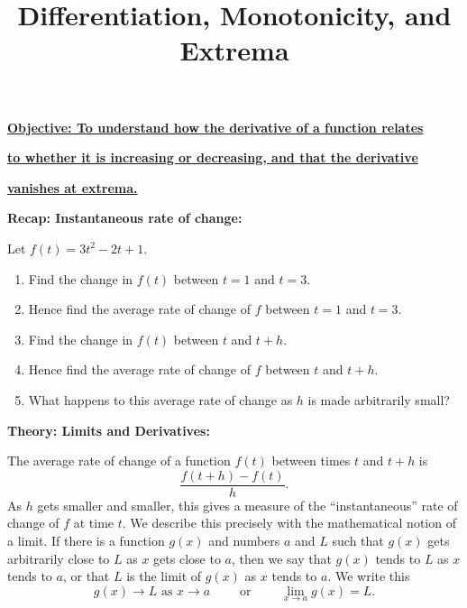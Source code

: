 \documentclass{article}
\begin{document}
\title{Differentiation, Monotonicity, and Extrema}
\date{}

\maketitle
\thispagestyle{empty}

\Large

\textbf{\underline{Objective: To understand how the derivative of a function relates}}

\textbf{\underline{to whether it is increasing or decreasing, and that the derivative}}

\textbf{\underline{vanishes at extrema.}}




\vspace{5mm}


\textbf{Recap: Instantaneous rate of change:}

\vspace{5mm}

Let $f(t)=3t^2-2t+1$.
\begin{enumerate}
	\item Find the change in $f(t)$ between $t=1$ and $t=3$.
	\item Hence find the average rate of change of $f$ between $t=1$ and $t=3$.
	\item Find the change in $f(t)$ between $t$ and $t+h$.
	\item Hence find the average rate of change of $f$ between $t$ and $t+h$.
	\item What happens to this average rate of change as $h$ is made arbitrarily small?
\end{enumerate}



\clearpage


{\bf Theory: Limits and Derivatives:}

\vspace{5mm}

The average rate of change of a function $f(t)$ between times $t$ and $t+h$ is
\[\frac{f(t+h)-f(t)}{h}.\]
As $h$ gets smaller and smaller, this gives a measure of the ``instantaneous'' rate of change of $f$ at time $t$. We describe this precisely with the mathematical notion of a limit. If there is a function $g(x)$ and numbers $a$ and $L$ such that $g(x)$ gets arbitrarily close to $L$ as $x$ gets close to $a$, then we say that $g(x)$ tends to $L$ as $x$ tends to $a$, or that $L$ is the limit of $g(x)$ as $x$ tends to $a$. We write this
\[g(x)\to L\mbox{ as }x\to a\qquad\mbox{ or }\qquad \lim_{x\to a}g(x)=L.\]
\end{document}
